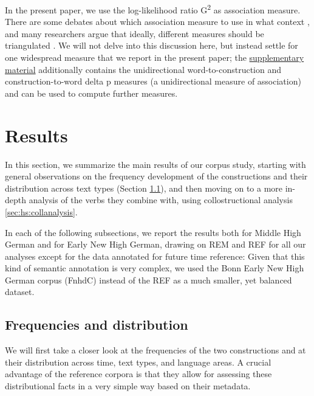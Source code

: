 \documentclass[output=paper,colorlinks,citecolor=brown]{langscibook}
\begin{document}
In the present paper, we use the log-likelihood ratio G\textsuperscript{2} as association measure. There are some debates about which association measure to use in what context \citep[see e.g.][]{wiechmannComputationCollostructionStrength2008}, and many researchers argue that ideally, different measures should be triangulated \citep[e.g.][]{griesFrequencyDispersionAssociation2024}. We will not delve into this discussion here, but instead settle for one widespread measure that we report in the present paper; the \hyperref[sec:hs:dataavailability]{supplementary material} additionally contains the unidirectional word-to-construction and construction-to-word delta p measures (a unidirectional measure of association) and can be used to compute further measures. 


\section{Results} \label{sec:hs:results}

In this section, we summarize the main results of our corpus study, starting with general observations on the frequency development of the constructions and their distribution across text types (Section \ref{sec:hs:frequencies}), and then moving on to a more in-depth analysis of the verbs they combine with, using collostructional analysis \ref{sec:hs:collanalysis}. 

In each of the following subsections, we  report the results both for Middle High German and for Early New High German, drawing on REM and REF for all our analyses except for the data annotated for future time reference: Given that this kind of semantic annotation is very complex, we used the Bonn Early New High German corpus (FnhdC) instead of the REF as a much smaller, yet balanced dataset.

\subsection{Frequencies and distribution} \label{sec:hs:frequencies}

We will first take a closer look at the frequencies of the two constructions and at their distribution across time, text types, and language areas. A crucial advantage of the reference corpora is that they allow for assessing these distributional facts in a very simple way based on their metadata. 
\end{document}
